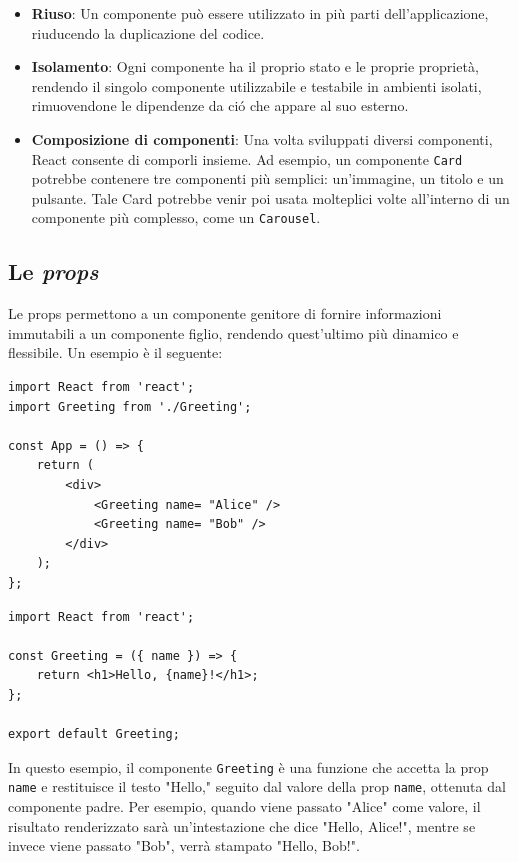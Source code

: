 \documentclass[target=bach,aauheader=,style=]{thud}
\begin{document}
\begin{itemize}
    \item \textbf{Riuso}: Un componente può essere utilizzato in più parti dell'applicazione, riuducendo la duplicazione del codice.
    \item \textbf{Isolamento}: Ogni componente ha il proprio stato e le proprie proprietà, rendendo il singolo componente utilizzabile e testabile in ambienti isolati, rimuovendone le dipendenze da ció che appare al suo esterno.
    \item \textbf{Composizione di componenti}: Una volta sviluppati diversi componenti, React consente di comporli insieme. Ad esempio, un componente \texttt{Card} potrebbe contenere tre componenti più semplici: un'immagine, un titolo e un pulsante. Tale Card potrebbe venir poi usata molteplici volte all'interno di un componente più complesso, come un \texttt{Carousel}.
\end{itemize}

\subsection{Le \textit{props}}
Le props permettono a un componente genitore di fornire informazioni immutabili a un componente figlio, rendendo quest'ultimo più dinamico e flessibile. Un esempio è il seguente:

\begin{minipage}[t]{0.45\textwidth}
    \begin{lstlisting}
import React from 'react';
import Greeting from './Greeting';

const App = () => {
    return (
        <div>
            <Greeting name= "Alice" />
            <Greeting name= "Bob" />
        </div>
    );
};  
    \end{lstlisting}
\end{minipage}
\hfill
\begin{minipage}[t]{0.45\textwidth}
    \begin{lstlisting}
import React from 'react';

const Greeting = ({ name }) => {
    return <h1>Hello, {name}!</h1>;
};

export default Greeting;
    \end{lstlisting}
\end{minipage}

\noindent In questo esempio, il componente \texttt{Greeting} è una funzione che accetta la prop \texttt{name} e restituisce il testo  "Hello," seguito dal valore della prop \texttt{name}, ottenuta dal componente padre. Per esempio, quando viene passato "Alice" come valore, il risultato renderizzato sarà un'intestazione che dice "Hello, Alice!", mentre se invece viene passato "Bob", verrà stampato "Hello, Bob!".
\end{document}
